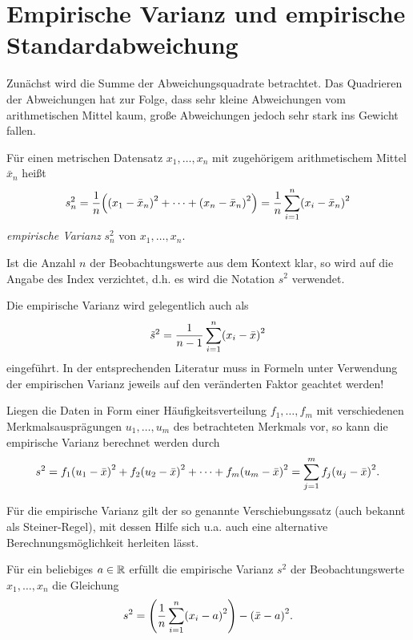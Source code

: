 \documentclass{lecture}
\begin{document}
    \section*{Empirische Varianz und empirische Standardabweichung}

    Zunächst wird die Summe der Abweichungsquadrate betrachtet.
    Das Quadrieren der Abweichungen hat zur Folge, dass sehr kleine Abweichungen vom arithmetischen Mittel kaum, große Abweichungen jedoch sehr stark ins Gewicht fallen.

    \begin{definition}
        Für einen metrischen Datensatz \(x_1, \ldots, x_n\) mit zugehörigem arithmetischem Mittel \(\bar{x}_n\) heißt
        \[
            s_n^2 = \frac{1}{n}\parentheses*{\parentheses*{x_1 - \bar{x}_n}^2 + \cdots + \parentheses*{x_n - \bar{x}_n}^2} = \frac{1}{n}\sum_{i = 1}^n \parentheses*{x_i - \bar{x}_n}^2
        \]
        \emph{empirische Varianz} \(s_n^2\) von \(x_1, \ldots, x_n\).

        Ist die Anzahl \(n\) der Beobachtungswerte aus dem Kontext klar, so wird auf die Angabe des Index verzichtet, d.h. es wird die Notation \(s^2\) verwendet.
    \end{definition}

    Die empirische Varianz wird gelegentlich auch als
    \[
        \tilde{s}^2 = \frac{1}{n - 1}\sum_{i = 1}^n \parentheses*{x_i - \bar{x}}^2
    \]
    eingeführt.
    In der entsprechenden Literatur muss in Formeln unter Verwendung der empirischen Varianz jeweils auf den veränderten Faktor geachtet werden!

    \begin{calcrule}
        Liegen die Daten in Form einer Häufigkeitsverteilung \(f_1, \ldots, f_m\) mit verschiedenen Merkmalsausprägungen \(u_1, \ldots, u_m\) des betrachteten Merkmals vor, so kann die empirische Varianz berechnet werden durch
        \[
            s^2 = f_1\parentheses*{u_1 - \bar{x}}^2 + f_2\parentheses*{u_2 - \bar{x}}^2 + \cdots + f_m\parentheses*{u_m - \bar{x}}^2 = \sum_{j = 1}^m f_j\parentheses*{u_j - \bar{x}}^2.
        \]
    \end{calcrule}

    Für die empirische Varianz gilt der so genannte Verschiebungssatz (auch bekannt als Steiner-Regel), mit dessen Hilfe sich u.a. auch eine alternative Berechnungsmöglichkeit herleiten lässt.

    \begin{calcrule}
        Für ein beliebiges \(a \in \mathbb{R}\) erfüllt die empirische Varianz \(s^2\) der Beobachtungswerte \(x_1, \ldots, x_n\) die Gleichung
        \[
            s^2 = \parentheses*{\frac{1}{n}\sum_{i = 1}^n \parentheses*{x_i - a}^2} - \parentheses*{\bar{x} - a}^2.
        \]
    \end{calcrule}
\end{document}
